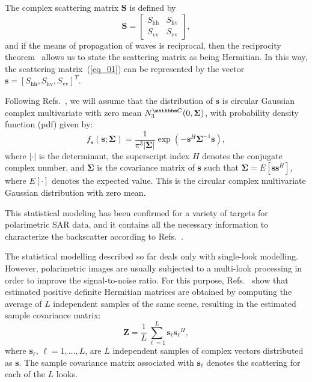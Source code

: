 \documentclass[conference]{IEEEtran}
\begin{document}
The complex scattering matrix $\mathbf{S}$ is defined by
\begin{equation}\label{eq_01}
\mathbf{S} = \left[
\begin{array}{cc}
	S_\text{hh}   & S_\text{hv}   \\
	S_{\text{vv}}   & S_{\text{vv}}   
\end{array}
\right],
\end{equation}
and if the means of propagation of waves is reciprocal, then the reciprocity theorem~\cite{lp} allows us to state the scattering matrix as being Hermitian. 
In this way, the scattering matrix~(\ref{eq_01}) can be represented by the vector $\mathbf{s}=[S_\text{hh},S_\text{hv},S_{\text{vv}}]^T$.

Following Refs.~\cite{good, lee}, we will assume that the distribution of $\mathbf{s}$ is circular Gaussian complex multivariate with zero mean $N^{\mathbbm C}_3(0,\mathbf{\Sigma})$, with probability density function (pdf) given by:
\begin{equation}
    f_{\mathbf{s}}(\mathbf{s};\mathbf{\Sigma})=\frac{1}{\pi^3|\mathbf{\Sigma}|} \exp(-\mathbf{s}^H\mathbf{\Sigma}^{-1}\mathbf{s}),
    \label{eq_03}
\end{equation}
where $|\cdot|$ is the determinant, 
the superscript index $H$ denotes the conjugate complex number, 
and $\mathbf{\Sigma}$ is the covariance matrix of $\mathbf{s}$ such that $\mathbf{\Sigma}=E[\mathbf{ss}^H]$, where $E[\cdot]$ denotes the expected value. 
This is the circular complex multivariate Gaussian distribution with zero mean.

This statistical modeling has been confirmed for a variety of targets for polarimetric SAR data, and it contains all the necessary information to characterize the backscatter according to Refs.~\cite{sarabendi,mfp}.
 
The statistical modelling described so far deals only with single-look modelling.
However, polarimetric images are usually subjected to a multi-look processing in order to improve the signal-to-noise ratio. 
For this purpose, Refs.~\cite{good, ade} show that estimated positive definite Hermitian matrices are obtained by computing the average of $L$ independent samples of the same scene, resulting in the estimated sample covariance matrix:
\begin{equation}
    \mathbf{Z}=\frac{1}{L}\sum_{\ell=1}^{L} {\mathbf{s}_\ell}{\mathbf{s}_\ell}^H,
    \label{eq_04}
\end{equation}
where $\mathbf{s}_\ell$, $\ell = 1, \dots, L$, are $L$ independent samples of complex vectors distributed as $\mathbf{s}$. 
The sample covariance matrix associated with $\mathbf{s}_\ell$ denotes the scattering for each of the $L$ looks.
\end{document}
